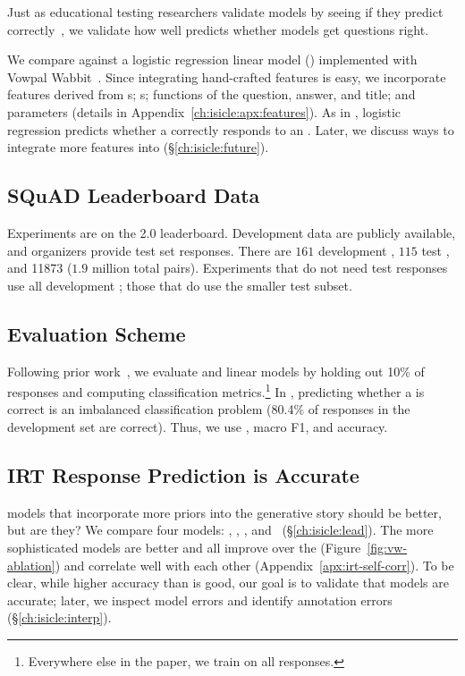 Just as educational testing researchers validate \irt{} models by
seeing if they predict \subj{} \resps{}
correctly~\citep{aera2014standards}, we validate how well \name{} predicts
whether \squad{} models get questions right.

We compare against a logistic regression linear model ()
implemented with Vowpal Wabbit~\citep{Agarwal2014ARE}.
Since integrating hand-crafted features is easy, we incorporate
features derived from \subj{} s; \itm{} s; functions
of the \squad{} question, answer, and title; and \irt{} parameters
(details in Appendix~\ref{ch:isicle:apx:features}).
As in \irt{}, logistic regression predicts whether a \subj{} correctly
responds to an \itm{}.
Later, we discuss ways to integrate more features into \irt{}
(\S\ref{ch:isicle:future}).

\subsection{SQuAD Leaderboard Data}
\label{ch:isicle:datasets}
Experiments are on the \squad{} 2.0 leaderboard.
Development data are publicly available, and organizers provide test set responses.
There are $161$ development \subjs{}, $115$ test \subjs{}, and \num[group-separator={,}]{11873} \itms{} ($1.9$ million total pairs).
Experiments that do not need test responses use all development \subjs{}; those that do use the smaller test subset.

\subsection{Evaluation Scheme}

Following prior work~\citep{wu2020virt}, we evaluate \irt{} and linear models by holding out 10\% of responses and computing classification metrics.\footnote{Everywhere else in the paper, we train on all responses.}
In \squad{}, predicting whether a \resp{} is correct is an imbalanced
classification problem (80.4\% of responses in the development set are
correct).
Thus, we use , macro F1, and accuracy.

\subsection{IRT Response Prediction is Accurate}
\label{ch:isicle:irt-compare}

\irt{} models that incorporate more priors into the generative story should be better, but are they?
We compare four \irt{} models: , , , and ~(\S\ref{ch:isicle:lead}).
The more sophisticated models are better and all improve over the
 (Figure~\ref{fig:vw-ablation}) and correlate well with each other (Appendix~\ref{apx:irt-self-corr}).
To be clear, while higher accuracy than  is good, our goal is to validate that \irt{} models are accurate; later, we inspect model errors and identify annotation errors (\S\ref{ch:isicle:interp}).

